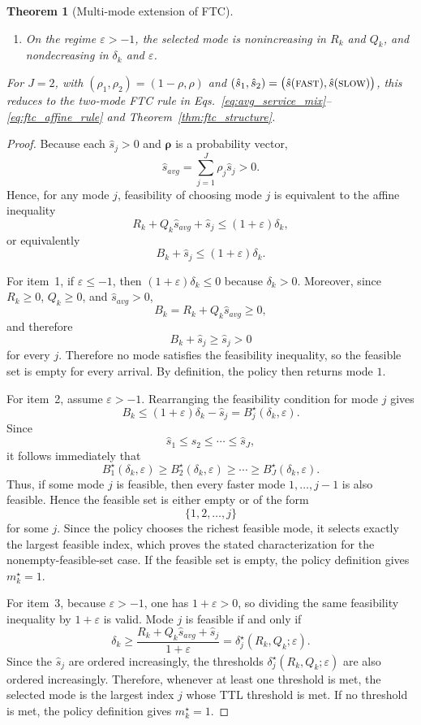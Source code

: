 \documentclass[preprint,12pt]{elsarticle}
\newtheorem{theorem}{Theorem}[section]
\begin{document}
\begin{theorem}[Multi-mode extension of FTC]
\begin{enumerate}
\item On the regime $\varepsilon > -1$, the selected mode is nonincreasing in
$R_k$ and $Q_k$, and nondecreasing in $\delta_k$ and $\varepsilon$.
\end{enumerate}

For $J=2$, with $(\rho_1,\rho_2)=(1-\rho,\rho)$ and
$(\hat{s}_1,\hat{s}_2)=\bigl(\hat{s}(\textsc{fast}),\hat{s}(\textsc{slow})\bigr)$, this reduces to the
two-mode FTC rule in Eqs.~\eqref{eq:avg_service_mix}--\eqref{eq:ftc_affine_rule} and Theorem~\ref{thm:ftc_structure}.
\end{theorem}

\begin{proof}
Because each $\hat{s}_j > 0$ and $\boldsymbol{\rho}$ is a probability vector,
\[
\hat{s}_{avg} = \sum_{j=1}^J \rho_j \hat{s}_j > 0.
\]
Hence, for any mode $j$, feasibility of choosing mode $j$ is equivalent to
the affine inequality
\[
R_k + Q_k \hat{s}_{avg} + \hat{s}_j \le (1+\varepsilon)\delta_k,
\]
or equivalently
\[
B_k + \hat{s}_j \le (1+\varepsilon)\delta_k.
\]

For item~1, if $\varepsilon \le -1$, then $(1+\varepsilon)\delta_k \le 0$ because
$\delta_k > 0$. Moreover, since $R_k \ge 0$, $Q_k \ge 0$, and $\hat{s}_{avg} > 0$,
\[
B_k = R_k + Q_k \hat{s}_{avg} \ge 0,
\]
and therefore
\[
B_k + \hat{s}_j \ge \hat{s}_j > 0
\]
for every $j$. Therefore no mode satisfies the feasibility inequality, so the
feasible set is empty for every arrival. By definition, the policy then returns
mode $1$.

For item~2, assume $\varepsilon > -1$. Rearranging the feasibility condition for
mode $j$ gives
\[
B_k \le (1+\varepsilon)\delta_k - \hat{s}_j = B_j^\star(\delta_k,\varepsilon).
\]
Since
\[
\hat{s}_1 \le \hat{s}_2 \le \cdots \le \hat{s}_J,
\]
it follows immediately that
\[
B_1^\star(\delta_k,\varepsilon) \ge B_2^\star(\delta_k,\varepsilon) \ge \cdots
\ge B_J^\star(\delta_k,\varepsilon).
\]
Thus, if some mode $j$ is feasible, then every faster mode
$1,\dots,j-1$ is also feasible. Hence the feasible set is either empty or of
the form
\[
\{1,2,\dots,j\}
\]
for some $j$. Since the policy chooses the richest feasible mode, it selects
exactly the largest feasible index, which proves the stated characterization
for the nonempty-feasible-set case. If the feasible set is empty, the policy
definition gives $m_k^\star=1$.

For item~3, because $\varepsilon > -1$, one has $1+\varepsilon > 0$, so dividing the
same feasibility inequality by $1+\varepsilon$ is valid. Mode $j$ is feasible if
and only if
\[
\delta_k \ge
\frac{R_k + Q_k \hat{s}_{avg} + \hat{s}_j}{1+\varepsilon}
=
\delta_j^\star(R_k,Q_k;\varepsilon).
\]
Since the $\hat{s}_j$ are ordered increasingly, the thresholds
$\delta_j^\star(R_k,Q_k;\varepsilon)$ are also ordered increasingly. Therefore,
whenever at least one threshold is met, the selected mode is the largest index
$j$ whose TTL threshold is met. If no threshold is met, the policy definition
gives $m_k^\star=1$.


\end{proof}
\end{document}
